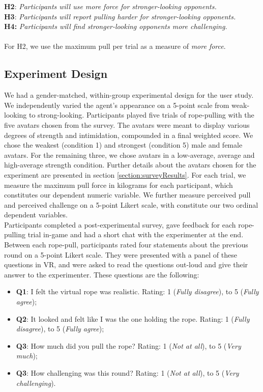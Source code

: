 \textbf{H2}: \textit{Participants will use more force for stronger-looking opponents.}\\

\textbf{H3}: \textit{Participants will report pulling harder for stronger-looking opponents.}\\

\textbf{H4:}\textit{ Participants will find stronger-looking opponents more challenging.}\\
\\
For H2, we use the maximum pull per trial as a measure of \textit{more force}. 

\subsection{Experiment Design}
\label{subsection:ExperimentDesign}
We had a gender-matched, within-group experimental design for the user study. We independently varied the agent's appearance on a 5-point scale from weak-looking to strong-looking. Participants played five trials of rope-pulling with the five avatars chosen from the survey. The avatars were meant to display various degrees of strength and intimidation, compounded in a final weighted score. We chose the weakest (condition 1) and strongest (condition 5) male and female avatars. For the remaining three, we chose avatars in a low-average, average and high-average strength condition. Further details about the avatars chosen for the experiment are presented in section \ref{section:surveyResults}. For each trial, we measure the maximum pull force in kilograms for each participant, which constitutes our dependent numeric variable. We further measure perceived pull and perceived challenge on a 5-point Likert scale, with constitute our two ordinal dependent variables.\\
Participants completed a post-experimental survey, gave feedback for each rope-pulling trial in-game and had a short chat with the experimenter at the end.\\
Between each rope-pull, participants rated four statements about the previous round on a 5-point Likert scale. They were presented with a panel of these questions in VR, and were asked to read the questions out-loud and give their answer to the experimenter. These questions are the following:
\begin{itemize}
\label{enum:panelQuestions}
\itemsep0em
\item \textbf{Q1}: I felt the virtual rope was realistic. Rating: 1 (\textit{Fully disagree}), to 5 (\textit{Fully agree});
\item \textbf{Q2}: It looked and felt like I was the one holding the rope. Rating: 1 (\textit{Fully disagree}), to 5 (\textit{Fully agree});
 \item \textbf{Q3}: How much did you pull the rope? Rating: 1 (\textit{Not at all}), to 5 (\textit{Very much});
\item \textbf{Q3}: How challenging was this round? Rating: 1 (\textit{Not at all}), to 5 (\textit{Very challenging}).
\end{itemize}
